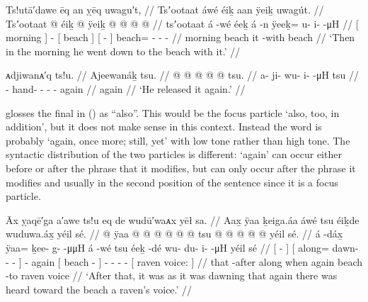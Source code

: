 \ex\label{ex:90-39-morning-beach-with-it}%
%
\begingl
	\glpreamble	Ts!utā′dawe ēq an ỵēq uwagu′t, //
	\glpreamble	Tsʼootaat áwé éiḵ aan ÿeiḵ uwagút. //
	\gla	{} Tsʼootaat {}  @ {} 
		{} éiḵ {} 
		{}  @ {} {}
		ÿeiḵ @  @ {} @ {} @ {} //
	\glb	{} tsʼootaat {} á -wé
		{} éeḵ {}
		{} á -n {}
		ÿeeḵ= u- i-  -μH //
	\glc	{}[ morning {}]  -
		{}[ beach {}]
		{}[  - {}]
		beach= - -  - //
	\gld	{} morning {}  {}
		{} beach {}
		{} it -with {}
		beach  {} {} {} //
	\glft	‘Then in the morning he went down to the beach with it.’
		//
\endgl
\xe

\ex\label{ex:90-40-let-it-go-again}%
%
\begingl
	\glpreamble	ᴀdjiwanᴀ′q ts!u. //
	\glpreamble	Ajeewanáḵ tsu. //
	\gla	{} @ {} @ {} @ {} @ {} @ {} tsu. //
	\glb	a- ji- wu- i-  -μH tsu //
	\glc	{}- hand- - -  - again //
	\gld	{} {} {} {} {} {} again //
	\glft	‘He released it again.’
		//
\endgl
\xe

\citeauthor{swanton:1909} glosses the final  in (\lastx) as “also”.
This would be the focus particle  ‘also, too, in addition’, but it does not make sense in this context.
Instead the word is probably  ‘again, once more; still, yet’ with low tone rather than high tone.
The syntactic distribution of the two particles is different:  ‘again’ can occur either before or after the phrase that it modifies, but  can only occur after the phrase it modifies and usually in the second position of the sentence since it is a focus particle.

\ex\label{ex:90-41-again-raven-voice}%
%
\begingl
	\glpreamble	Āx ỵaqē′ga a′awe ts!u eq de wudū′waᴀx yēł sa. //
	\glpreamble	Aax̱ ÿaa ḵeiga.áa áwé tsu éiḵde wuduwa.áx̱ yéil sé. //
	\gla	{}  @ {} {}
		{} ÿaa @  @ {} @ {} @ {} @ {} {} 
		 @ {}
		tsu
		{}  @ {} {}
		 @ {} @ {} @ {} @ {}
		{} yéil sé. {} //
	\glb	{} á -dáx̱ {}
		{} ÿaa= ḵee- g-  -μμH {} {}
		á -wé
		tsu
		{} éeḵ -dé {}
		wu- du- i-  -μH
		{} yéil sé {} //
	\glc	{}[  - {}]
		{}[ along= dawn- -  - \· {}]
		 -
		again
		{}[ beach - {}]
		- - -  -
		{}[ raven voice: {}] //
	\gld	{} that -after {}
		{} along  {} {} {} \·when {}
		 {}
		again
		{} beach -to {}
		 {} {} {} {}
		{} raven voice {} //
	\glft	‘After that, it was as it was dawning that again there was heard toward the beach a raven’s voice.’
		//
\endgl
\xe

